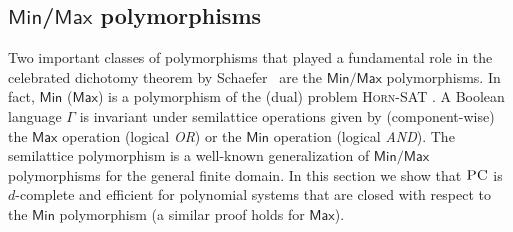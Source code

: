 \documentclass[11pt]{article}
\newcommand{\sos}{\text{\sc{SoS}}}
\newcommand{\Cc}{\mathcal{C}}
\newcommand{\Pol}{\textsf{Pol}}
\newcommand{\PC}{\textsc{PC}}
\newcommand{\Max}{\textsf{Max}}
\newcommand{\Min}{\textsf{Min}}
\newcommand{\I}{\emph{$\rm{I}$}}
\newcommand{\1}{\textbf{1}}
\newcommand{\GB}{\text{Gr\"{o}bner} }
\newcommand{\Field}{\mathbb{Q}}
\begin{document}
\subsection[Min/Max polymorphisms]{$\Min$/$\Max$ polymorphisms}



Two important classes of polymorphisms that played a fundamental role in the celebrated dichotomy theorem by Schaefer~\cite{Schaefer78} are the $\Min/\Max$ polymorphisms. In fact, $\Min$ ($\Max$) is a polymorphism of the (dual) problem \textsc{Horn-SAT} \cite{JEAVONS_TRACTABLE_CONSTRAINTS}. A Boolean language $\Gamma$ is invariant under semilattice operations given by (component-wise) the $\Max$ operation (logical \emph{OR}) or the $\Min$ operation (logical \emph{AND}). The semilattice polymorphism is a well-known generalization of $\Min/\Max$ polymorphisms for the general finite domain.
%
In this section we show that $\PC$ is $d$-complete and efficient for polynomial systems that are closed with respect to the $\Min$ polymorphism (a similar proof holds for $\Max$). 
%
%
%
%
%
\end{document}
